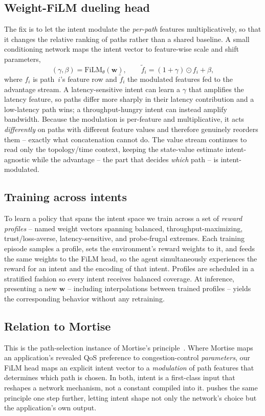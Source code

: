 \subsection{Weight-FiLM dueling head}
The fix is to let the intent modulate the \emph{per-path} features multiplicatively, so that it changes
the relative ranking of paths rather than a shared baseline. A small conditioning network maps the intent
vector to feature-wise scale and shift parameters,
\begin{equation}
(\gamma, \beta) = \mathrm{FiLM}_\theta(\mathbf{w}), \qquad
\tilde{f}_i = (1 + \gamma) \odot f_i + \beta,
\label{eq:p1film}
\end{equation}
where $f_i$ is path~$i$'s feature row and $\tilde{f}_i$ the modulated features fed to the advantage
stream. A latency-sensitive intent can learn a $\gamma$ that amplifies the latency feature, so paths
differ more sharply in their latency contribution and a low-latency path wins; a throughput-hungry intent
can instead amplify bandwidth. Because the modulation is per-feature and multiplicative, it acts
\emph{differently} on paths with different feature values and therefore genuinely reorders them -- exactly
what concatenation cannot do. The value stream continues to read only the topology/time context, keeping
the state-value estimate intent-agnostic while the advantage -- the part that decides \emph{which} path --
is intent-modulated.

\subsection{Training across intents}
To learn a policy that spans the intent space we train across a set of \emph{reward profiles} -- named
weight vectors spanning balanced, throughput-maximizing, trust/loss-averse, latency-sensitive, and
probe-frugal extremes. Each training episode samples a profile, sets the environment's reward weights to
it, and feeds the same weights to the FiLM head, so the agent simultaneously experiences the reward for an
intent and the encoding of that intent. Profiles are scheduled in a stratified fashion so every intent
receives balanced coverage. At inference, presenting a new $\mathbf{w}$ -- including interpolations between
trained profiles -- yields the corresponding behavior without any retraining.

\subsection{Relation to Mortise}
This is the path-selection instance of Mortise's principle~\cite{Shen2026}. Where Mortise maps an
application's revealed QoS preference to congestion-control \emph{parameters}, our FiLM head maps an
explicit intent vector to a \emph{modulation} of path features that determines which path is chosen. In
both, intent is a first-class input that reshapes a network mechanism, not a constant compiled into it.
 pushes the same principle one step further, letting intent shape not only the network's
choice but the application's own output.
